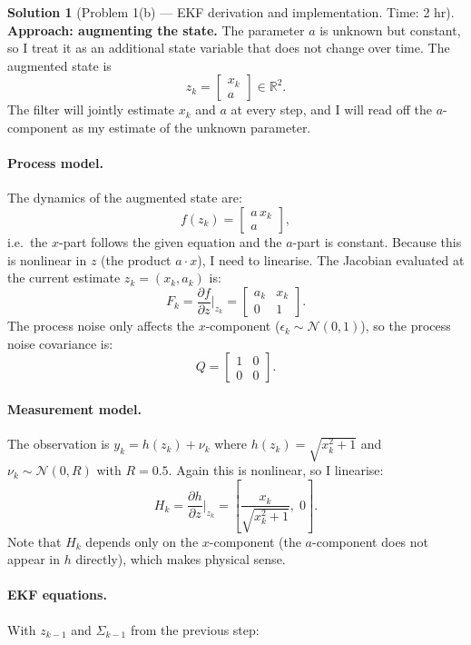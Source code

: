 \documentclass[11pt, reqno, letterpaper]{amsart}
\theoremstyle{plain}
\theoremstyle{definition}
\newtheorem{solution}[theorem]{Solution}
\begin{document}
\medskip
\begin{solution}[Problem 1(b) — EKF derivation and implementation. Time: 2 hr]

\textbf{Approach: augmenting the state.}
The parameter $a$ is unknown but constant, so I treat it as an additional
state variable that does not change over time.  The augmented state is
\[
  z_k = \begin{bmatrix} x_k \\ a \end{bmatrix} \in \mathbb{R}^2.
\]
The filter will jointly estimate $x_k$ and $a$ at every step, and I will
read off the $a$-component as my estimate of the unknown parameter.

\paragraph{Process model.}
The dynamics of the augmented state are:
\[
  f(z_k) = \begin{bmatrix} a\,x_k \\ a \end{bmatrix},
\]
i.e.\ the $x$-part follows the given equation and the $a$-part is constant.
Because this is nonlinear in $z$ (the product $a\cdot x$), I need to
linearise.  The Jacobian evaluated at the current estimate $z_k=(x_k,a_k)$ is:
\[
  F_k = \frac{\partial f}{\partial z}\bigg|_{z_k}
      = \begin{bmatrix} a_k & x_k \\ 0 & 1 \end{bmatrix}.
\]
The process noise only affects the $x$-component ($\epsilon_k\sim\mathcal{N}(0,1)$),
so the process noise covariance is:
\[
  Q = \begin{bmatrix} 1 & 0 \\ 0 & 0 \end{bmatrix}.
\]

\paragraph{Measurement model.}
The observation is $y_k = h(z_k) + \nu_k$ where
$h(z_k) = \sqrt{x_k^2+1}$ and $\nu_k\sim\mathcal{N}(0,R)$ with $R=0.5$.
Again this is nonlinear, so I linearise:
\[
  H_k = \frac{\partial h}{\partial z}\bigg|_{z_k}
       = \left[\frac{x_k}{\sqrt{x_k^2+1}},\; 0\right].
\]
Note that $H_k$ depends only on the $x$-component (the $a$-component does
not appear in $h$ directly), which makes physical sense.

\paragraph{EKF equations.}
With $z_{k-1}$ and $\Sigma_{k-1}$ from the previous step:


\end{solution}
\end{document}

